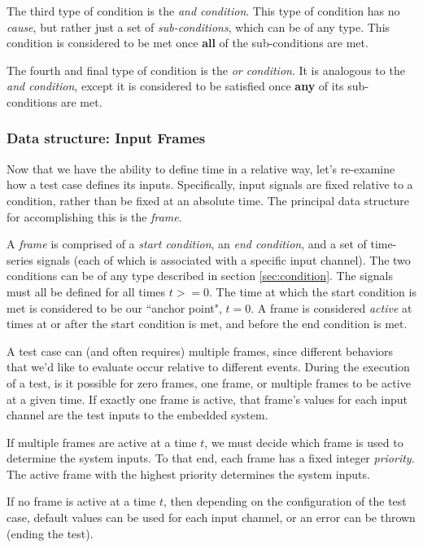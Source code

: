 \documentclass[12pt]{article}
\begin{document}
The third type of condition is the \textit{and condition}.  This type of condition has no \textit{cause}, but rather just a set of \textit{sub-conditions}, which can be of any type.  This condition is considered to be met once \textbf{all} of the sub-conditions are met.

The fourth and final type of condition is the \textit{or condition}.  It is analogous to the \textit{and condition}, except it is considered to be satisfied once \textbf{any} of its sub-conditions are met.

\subsubsection{Data structure: Input Frames}
\label{sec:frames}
Now that we have the ability to define time in a relative way, let's re-examine how a test case defines its inputs.  Specifically, input signals are fixed relative to a condition, rather than be fixed at an absolute time.  The principal data structure for accomplishing this is the \textit{frame}.

A \textit{frame} is comprised of a \textit{start condition}, an \textit{end condition}, and a set of time-series signals (each of which is associated with a specific input channel).  The two conditions can be of any type described in section \ref{sec:condition}.  The signals must all be defined for all times $t>=0$.  The time at which the start condition is met is considered to be our ``anchor point", $t=0$.  A frame is considered \textit{active} at times at or after the start condition is met, and before the end condition is met.

A test case can (and often requires) multiple frames, since different behaviors that we'd like to evaluate occur relative to different events.  During the execution of a test, is it possible for zero frames, one frame, or multiple frames to be active at a given time.  If exactly one frame is active, that frame's values for each input channel are the test inputs to the embedded system.

If multiple frames are active at a time $t$, we must decide which frame is used to determine the system inputs.  To that end, each frame has a fixed integer \textit{priority}.  The active frame with the highest priority determines the system inputs.

If no frame is active at a time $t$, then depending on the configuration of the test case, default values can be used for each input channel, or an error can be thrown (ending the test).
\end{document}
